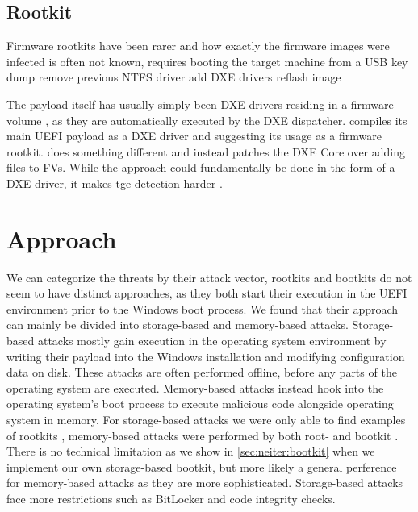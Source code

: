 \subsection{Rootkit}


Firmware rootkits have been rarer and how exactly the firmware images were infected is often not known,
\cite{vector-edk} requires booting the target machine from a USB key \cite{mosaicregressor}
 \cite{lojax}
dump
remove previous NTFS driver
add DXE drivers
reflash image

The payload itself has usually simply been \ac{DXE} drivers residing in a firmware volume \cite{mosaicregressor, lojax}, as they are automatically executed by the \ac{DXE} dispatcher. \cite{efiguard} compiles its main \ac{UEFI} payload as a \ac{DXE} driver and suggesting its usage as a firmware rootkit. \cite{moonbounce} does something different and instead patches the \ac{DXE} Core over adding files to \acp{FV}. While the approach could fundamentally be done in the form of a \ac{DXE} driver, it makes tge detection harder \cite{moonbounce}.

\section{Approach}

We can categorize the threats by their attack vector, rootkits and bootkits do not seem to have distinct approaches, as they both start their execution in the \ac{UEFI} environment prior to the Windows boot process. We found that their approach can mainly be divided into storage-based and memory-based attacks. Storage-based attacks mostly gain execution in the operating system  environment by writing their payload into the Windows installation and modifying configuration data on disk. These attacks are often performed offline, before any parts of the operating system are executed. Memory-based attacks instead hook into the operating system's boot process to execute malicious code alongside operating system in memory. For storage-based attacks we were only able to find examples of rootkits \cite{vector-edk, mosaicregressor, lojax}, memory-based attacks were performed by both root- and bootkit \cite{dreamboot, efiguard, especter, finspy ,moonbounce, cosmicstrand}. There is no technical limitation as we show in \autoref{sec:neiter:bootkit} when we implement our own storage-based bootkit, but more likely a general perference for memory-based attacks as they are more sophisticated. Storage-based attacks face more restrictions such as BitLocker and code integrity checks.

